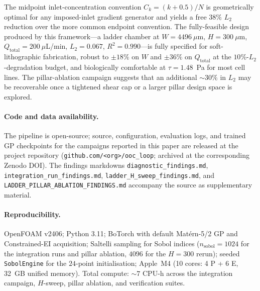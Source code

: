 \documentclass[12pt]{article}
\begin{document}
The midpoint inlet-concentration convention $C_k = (k + 0.5)/N$ is geometrically optimal for any imposed-inlet gradient generator and yields a free $38\%$ $L_2$ reduction over the more common endpoint convention. The fully-feasible design produced by this framework---a ladder chamber at $W = 4496~\mu$m, $H = 300~\mu$m, $Q_{\text{total}} = 200~\mu$L/min, $L_2 = 0.067$, $R^2 = 0.990$---is fully specified for soft-lithographic fabrication, robust to $\pm 18\%$ on $W$ and $\pm 36\%$ on $Q_{\text{total}}$ at the $10\%$-$L_2$-degradation budget, and biologically comfortable at $\tau = 1.48$~Pa for most cell lines. The pillar-ablation campaign suggests that an additional $\sim 30\%$ in $L_2$ may be recoverable once a tightened shear cap or a larger pillar design space is explored.

\paragraph{Code and data availability.} The pipeline is open-source; source, configuration, evaluation logs, and trained GP checkpoints for the campaigns reported in this paper are released at the project repository (\texttt{github.com/<org>/ooc\_loop}; archived at the corresponding Zenodo DOI). The findings markdowns \texttt{diagnostic\_findings.md}, \texttt{integration\_run\_findings.md}, \texttt{ladder\_H\_sweep\_findings.md}, and \texttt{LADDER\_PILLAR\_ABLATION\_FINDINGS.md} accompany the source as supplementary material.

\paragraph{Reproducibility.} OpenFOAM v2406; Python 3.11; BoTorch with default Mat\'ern-5/2 GP and Constrained-EI acquisition; Saltelli sampling for Sobol indices ($n_{\text{sobol}} = 1024$ for the integration runs and pillar ablation, $4096$ for the $H = 300$ rerun); seeded \texttt{SobolEngine} for the $24$-point initialisation; Apple~M4 (10 cores: 4 P + 6 E, 32~GB unified memory). Total compute: $\sim 7$ CPU-h across the integration campaign, $H$-sweep, pillar ablation, and verification suites.
\end{document}
